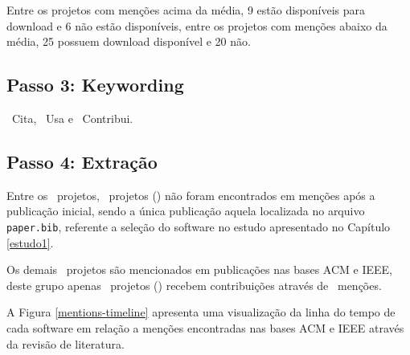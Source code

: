 Entre os projetos com menções acima da média, 9 estão disponíveis para download
e 6 não estão disponíveis, entre os projetos com menções abaixo da média, 25
possuem download disponível e 20 não.



\subsection{Passo 3: Keywording}

\CiteCount \ Cita,
\UseCount \ Usa e
\ContributeCount \ Contribui.

\subsection{Passo 4: Extração}

Entre os \SoftwareCount \ projetos, \SoftwareNotMentionedCount \ projetos
() não foram encontrados em menções
após a publicação inicial, sendo a única publicação aquela localizada no
arquivo \texttt{paper.bib}, referente a seleção do software no estudo
apresentado no Capítulo \ref{estudo1}.

Os demais \MentionsStudyDois \ projetos são mencionados em publicações nas
bases ACM e IEEE, deste grupo apenas \ContributeStudyDoisSoftware \ projetos
() recebem contribuições através de
\ContributeStudyDoisCount \ menções.

A Figura \ref{mentions-timeline} apresenta uma visualização da linha do tempo
de cada software em relação a menções encontradas nas bases ACM e IEEE através
da revisão de literatura.


